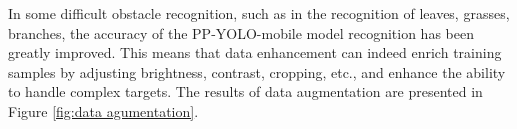 \documentclass[sensors,article,submit,moreauthors,pdftex]{Definitions/mdpi}
\begin{document}
In some difficult obstacle recognition, such as in the recognition of leaves, grasses, branches, the accuracy of the PP-YOLO-mobile model recognition has been greatly improved. This means that data enhancement can indeed enrich training samples by adjusting brightness, contrast, cropping, etc., and enhance the ability to handle complex targets. The results of data augmentation are presented in Figure \ref{fig:data agumentation}. 

\begin{figure}[htbp]
\centering
{}
\quad
{}
\quad
{}
\quad
{}
\quad
{}
\end{figure}
\end{document}
